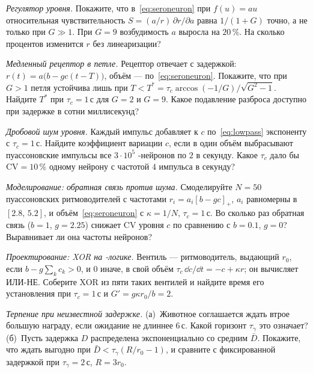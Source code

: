 \begin{exercise}[\lvlA]
\label{ex:05:2}
\emph{Регулятор уровня.} Покажите, что в~\eqref{eq:seroneuron} при $f(u)=au$ относительная чувствительность $S=(a/r)\,\partial r/\partial a$ равна $1/(1+G)$ точно, а не только при $G\gg1$. При $G=9$ возбудимость $a$ выросла на $20\,\%$. На сколько процентов изменится $r$ без линеаризации?
\end{exercise}

\begin{exercise}[\lvlB]
\label{ex:05:3}
\emph{Медленный рецептор в петле.} Рецептор  отвечает с задержкой: $r(t)=a\bigl(b-gc(t-T)\bigr)$, объём --- по~\eqref{eq:seroneuron}. Покажите, что при $G>1$ петля устойчива лишь при $T<T^*=\tau_c\arccos(-1/G)/\sqrt{G^2-1}$. Найдите $T^*$ при $\tau_c=1\,\text{с}$ для $G=2$ и $G=9$. Какое подавление разброса доступно при задержке в сотни миллисекунд?
\end{exercise}

\begin{exercise}[\lvlB]
\label{ex:05:4}
\emph{Дробовой шум уровня.} Каждый импульс добавляет к $c$ по~\eqref{eq:lowpass} экспоненту с $\tau_c=1\,\text{с}$. Найдите коэффициент вариации $c$, если в один объём выбрасывают пуассоновские импульсы все $3\cdot10^5$ -нейронов по $2$ в секунду. Какое $\tau_c$ дало бы $\mathrm{CV}=10\,\%$ одному нейрону с частотой $4$ импульса в секунду?
\end{exercise}

\begin{exercise}[\lvlB]
\label{ex:05:5}
\emph{Моделирование: обратная связь против шума.} Смоделируйте $N=50$ пуассоновских ритмоводителей с частотами $r_i=a_i[b-gc]_+$, $a_i$ равномерны в $[2.8,\,5.2]$, и объём~\eqref{eq:seroneuron} с $\kappa=1/N$, $\tau_c=1\,\text{с}$. Во сколько раз обратная связь ($b=1$, $g=2.25$) снижает CV уровня $c$ по сравнению с $b=0.1$, $g=0$? Выравнивает ли она частоты нейронов?
\end{exercise}

\begin{exercise}[\lvlB]
\label{ex:05:6}
\emph{Проектирование: XOR на -логике.} Вентиль --- ритмоводитель, выдающий $r_0$, если $b-g\sum_kc_k>0$, и $0$ иначе, в свой объём $\tau_c\,\dd c/\dd t=-c+\kappa r$; он вычисляет ИЛИ-НЕ. Соберите XOR из пяти таких вентилей и найдите время его установления при $\tau_c=1\,\text{с}$ и $G'=g\kappa r_0/b=2$.
\end{exercise}

\begin{exercise}[\lvlB]
\label{ex:05:7}
\emph{Терпение при неизвестной задержке.} (а)~Животное соглашается ждать втрое большую награду, если ожидание не длиннее $6\,\text{с}$. Какой горизонт $\tau_\gamma$ это означает? (б)~Пусть задержка $D$ распределена экспоненциально со средним $\bar D$. Покажите, что ждать выгодно при $\bar D<\tau_\gamma(R/r_0-1)$, и сравните с фиксированной задержкой при $\tau_\gamma=2\,\text{с}$, $R=3r_0$.
\end{exercise}

